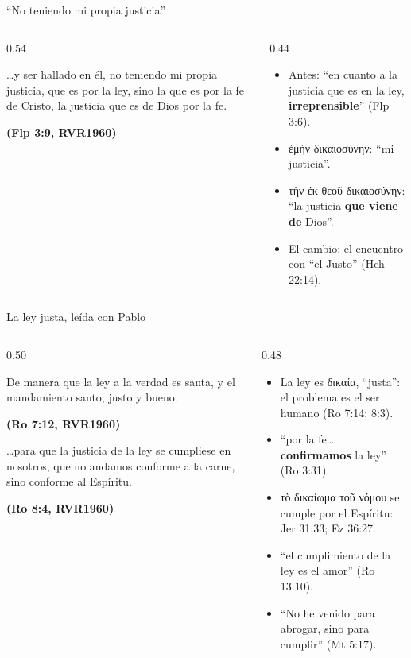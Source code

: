 \documentclass[hyperref={bookmarks=false},aspectratio=169]{beamer}
\newcommand{\grc}[1]{\foreignlanguage{ancientgreek}{#1}}
\newcommand{\fuente}[1]{\par\hfill{\upshape\bfseries\footnotesize\textcolor{azul}{#1}}}
\newcommand{\destacar}[1]{\textbf{\textcolor{azul}{#1}}}
\begin{document}
\begin{frame}{``No teniendo mi propia justicia''}
\begin{columns}[c,onlytextwidth]
\begin{column}{0.54\textwidth}
\begin{cita}\ldots{}y ser hallado en él, no teniendo mi propia justicia, que es por la ley, sino la que es por la fe de Cristo, la justicia que es de Dios por la fe.\fuente{(Flp 3:9, RVR1960)}\end{cita}
\end{column}
\begin{column}{0.44\textwidth}\small
\begin{itemize}
\item Antes: ``en cuanto a la justicia que es en la ley, \destacar{irreprensible}'' (Flp 3:6).
\item \grc{ἐμὴν δικαιοσύνην}: ``mi justicia''.
\item \grc{τὴν ἐκ θεοῦ δικαιοσύνην}: ``la justicia \destacar{que viene de} Dios''.
\item El cambio: el encuentro con ``el Justo'' (Hch 22:14).
\end{itemize}
\end{column}
\end{columns}
\end{frame}

\begin{frame}{La ley justa, leída con Pablo}
\begin{columns}[c,onlytextwidth]
\begin{column}{0.50\textwidth}
\begin{cita}De manera que la ley a la verdad es santa, y el mandamiento santo, justo y bueno.\fuente{(Ro 7:12, RVR1960)}\end{cita}
\begin{cita}\ldots{}para que la justicia de la ley se cumpliese en nosotros, que no andamos conforme a la carne, sino conforme al Espíritu.\fuente{(Ro 8:4, RVR1960)}\end{cita}
\end{column}
\begin{column}{0.48\textwidth}\small
\begin{itemize}
\item La ley es \grc{δικαία}, ``justa'': el problema es el ser humano (Ro 7:14; 8:3).
\item ``por la fe\ldots{} \destacar{confirmamos} la ley'' (Ro 3:31).
\item \grc{τὸ δικαίωμα τοῦ νόμου} se cumple por el Espíritu: Jer 31:33; Ez 36:27.
\item ``el cumplimiento de la ley es el amor'' (Ro 13:10).
\item ``No he venido para abrogar, sino para cumplir'' (Mt 5:17).
\end{itemize}
\end{column}
\end{columns}
\end{frame}
\end{document}
